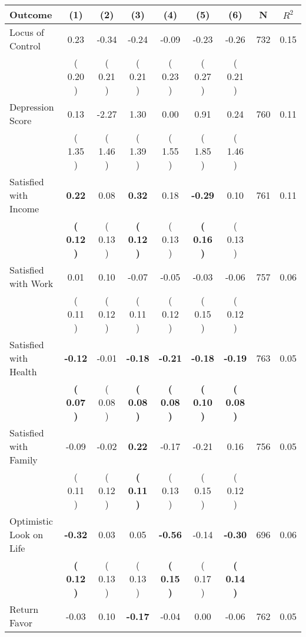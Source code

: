 \begin{tabular}{lcccccccc}
\toprule
 \textbf{Outcome} & \textbf{(1)} & \textbf{(2)} & \textbf{(3)} & \textbf{(4)} & \textbf{(5)} & \textbf{(6)} & \textbf{N} & \textbf{$ R^2$} \\
\midrule
Locus of Control &      0.23 &     -0.34 &     -0.24 &     -0.09 &     -0.23 &     -0.26 & 732 &       0.15 \\ 
 & (     0.20 ) & (     0.21 ) & (     0.21 ) & (     0.23 ) & (     0.27 ) & (     0.21 ) & \\
Depression Score &      0.13 &     -2.27 &      1.30 &      0.00 &      0.91 &      0.24 & 760 &       0.11 \\ 
 & (     1.35 ) & (     1.46 ) & (     1.39 ) & (     1.55 ) & (     1.85 ) & (     1.46 ) & \\
Satisfied with Income & \textbf{     0.22} &      0.08 & \textbf{     0.32} &      0.18 & \textbf{    -0.29} &      0.10 & 761 &       0.11 \\ 
 & \textbf{(     0.12 )} & (     0.13 ) & \textbf{(     0.12 )} & (     0.13 ) & \textbf{(     0.16 )} & (     0.13 ) & \\
Satisfied with Work &      0.01 &      0.10 &     -0.07 &     -0.05 &     -0.03 &     -0.06 & 757 &       0.06 \\ 
 & (     0.11 ) & (     0.12 ) & (     0.11 ) & (     0.12 ) & (     0.15 ) & (     0.12 ) & \\
Satisfied with Health & \textbf{    -0.12} &     -0.01 & \textbf{    -0.18} & \textbf{    -0.21} & \textbf{    -0.18} & \textbf{    -0.19} & 763 &       0.05 \\ 
 & \textbf{(     0.07 )} & (     0.08 ) & \textbf{(     0.08 )} & \textbf{(     0.08 )} & \textbf{(     0.10 )} & \textbf{(     0.08 )} & \\
Satisfied with Family &     -0.09 &     -0.02 & \textbf{     0.22} &     -0.17 &     -0.21 &      0.16 & 756 &       0.05 \\ 
 & (     0.11 ) & (     0.12 ) & \textbf{(     0.11 )} & (     0.13 ) & (     0.15 ) & (     0.12 ) & \\
Optimistic Look on Life & \textbf{    -0.32} &      0.03 &      0.05 & \textbf{    -0.56} &     -0.14 & \textbf{    -0.30} & 696 &       0.06 \\ 
 & \textbf{(     0.12 )} & (     0.13 ) & (     0.13 ) & \textbf{(     0.15 )} & (     0.17 ) & \textbf{(     0.14 )} & \\
Return Favor &     -0.03 &      0.10 & \textbf{    -0.17} &     -0.04 &      0.00 &     -0.06 & 762 &       0.05 \\ 

\end{tabular}
